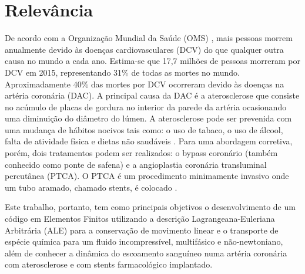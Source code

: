 \section{Relevância}

De acordo com a Organização Mundial da Saúde (OMS) \cite{oms}, mais pessoas morrem anualmente devido às doenças cardiovasculares (DCV) do que qualquer outra causa no mundo a cada ano. 
Estima-se que 17,7 milhões de pessoas morreram por DCV em 2015, representando 31\% de todas as mortes no mundo. 
Aproximadamente 40\% das mortes por DCV ocorreram devido às doenças na artéria coronária (DAC). 
A principal causa da DAC é a aterosclerose que consiste no acúmulo de placas de gordura no interior da parede da artéria ocasionando uma diminuição do diâmetro do lúmen. 
A aterosclerose pode ser prevenida com uma mudança de hábitos nocivos tais como: o uso de tabaco, o uso de álcool, falta de atividade física e dietas não saudáveis \cite{spring2013}. 
Para uma abordagem corretiva, porém, dois tratamentos podem ser realizados: o bypass coronário (também conhecido como ponte de safena) e a angioplastia coronária transluminal percutânea (PTCA). 
O PTCA é um procedimento minimamente invasivo onde um tubo aramado, chamado stents, é colocado \cite{sigwart1987}.

\medskip
Este trabalho, portanto, tem como principais objetivos o desenvolvimento de um código em Elementos Finitos utilizando a descrição Lagrangeana-Euleriana Arbitrária (ALE) \cite{donea2004} para a conservação de movimento linear e o transporte de espécie química para um fluido incompressível, multifásico e não-newtoniano, além de 
conhecer a dinâmica do escoamento sanguíneo numa artéria coronária com aterosclerose e com stents farmacológico implantado.

